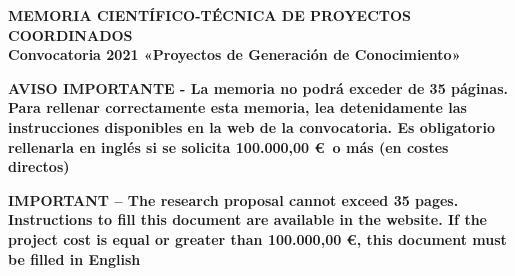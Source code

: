 \documentclass[a4paper,11pt,oneside, english]{article}
\begin{document}
\begin{tcolorbox}[colback=white,arc=0pt,outer arc=0pt,colframe=black,boxrule=0.6pt]
  \begin{center}
    {\bf MEMORIA CIENT\'IFICO-T\'ECNICA DE PROYECTOS COORDINADOS\\
    Convocatoria 2021 «Proyectos de Generación de Conocimiento»}
  \end{center}
\end{tcolorbox}
\vspace{-0.2cm}
\begin{tcolorbox}[colback=yellow,arc=0pt,outer arc=0pt,colframe=black,boxrule=0.6pt,left=0mm,right=0mm]
  \begin{center}
    {\bf \small AVISO IMPORTANTE - La memoria no podr\'a exceder de 35 p\'aginas. Para rellenar
      correctamente esta memoria, lea detenidamente las instrucciones disponibles en la web de la
      convocatoria. Es obligatorio rellenarla en ingl\'es si se solicita 100.000,00 \euro\ o m\'as (en costes directos) }
  \end{center}
  \begin{center}
    {\bf \small IMPORTANT -- The research proposal cannot exceed 35 pages. Instructions to fill this document
      are available in the website. If the project cost is equal or greater than 100.000,00 \euro, this document must be
      filled in English}
  \end{center}
\end{tcolorbox}
\end{document}
